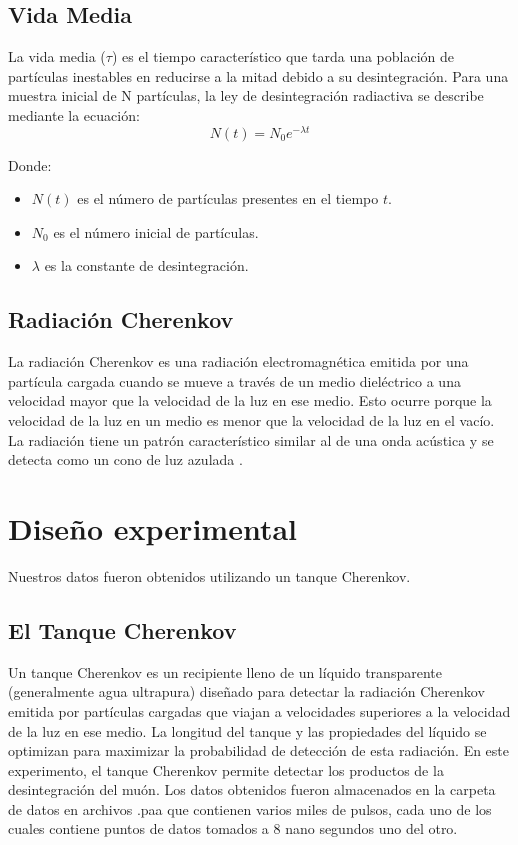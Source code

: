 \documentclass[twocolumn,a4paper,11pt]{scrartcl}
\begin{document}
\subsection*{Vida Media}
La vida media ($\tau$) es el tiempo característico que tarda una población de partículas inestables en reducirse a la mitad debido a su desintegración. Para una muestra inicial de N partículas, la ley de desintegración radiactiva se describe mediante la ecuación:
\begin{equation}
  \label{eq:exponencial}
  N(t) = N_0 e^{- \lambda t }
\end{equation}

Donde:
\begin{itemize}
\item   $N(t)$ es el número de partículas presentes en el tiempo $t$.
\item   $N_0$ es el número inicial de partículas.
\item   $\lambda$ es la constante de desintegración.
\end{itemize}


\subsection*{Radiación Cherenkov}
La radiación Cherenkov es una radiación electromagnética emitida por una partícula cargada cuando se mueve a través de un medio dieléctrico a una velocidad mayor que la velocidad de la luz en ese medio. Esto ocurre porque la velocidad de la luz en un medio es menor que la velocidad de la luz en el vacío. La radiación tiene un patrón característico similar al de una onda acústica y se detecta como un cono de luz azulada \cite{WikipediaCherenkov}.


\section{Diseño experimental}
Nuestros datos fueron obtenidos utilizando un tanque Cherenkov.
\subsection*{El Tanque Cherenkov}
Un tanque Cherenkov es un recipiente lleno de un líquido transparente (generalmente agua ultrapura) diseñado para detectar la radiación Cherenkov \cite{WikipediaCherenkov} emitida por partículas cargadas que viajan a velocidades superiores a la velocidad de la luz en ese medio. La longitud del tanque y las propiedades del líquido se optimizan para maximizar la probabilidad de detección de esta radiación. En este experimento, el tanque Cherenkov permite detectar los productos de la desintegración del muón. Los datos obtenidos fueron almacenados en la carpeta de datos \cite{CarpetaDatos} en archivos .paa que contienen varios miles de pulsos, cada uno de los cuales contiene puntos de datos tomados a 8 nano segundos uno del otro.
\end{document}
